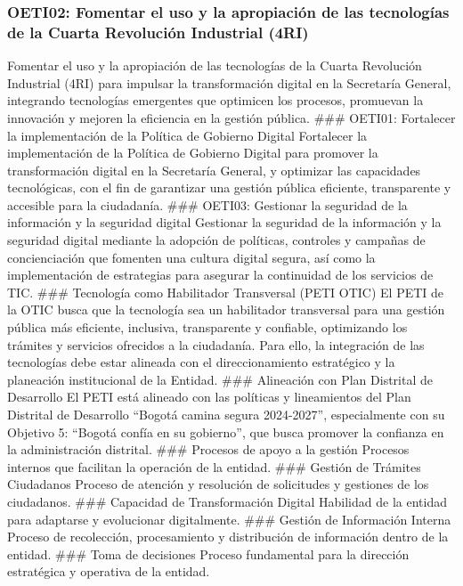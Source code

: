 \documentclass[
	a4paper, %
	12pt, %
]{include/CSSullivanBusinessReport}
\begin{document}
\subsubsection{OETI02: Fomentar el uso y la apropiación de las
tecnologías de la Cuarta Revolución Industrial
(4RI)}\label{sec:oeti02-fomentar-el-uso-y-la-apropiaciuxf3n-de-las-tecnologuxedas-de-la-cuarta-revoluciuxf3n-industrial-4ri}

Fomentar el uso y la apropiación de las tecnologías de la Cuarta
Revolución Industrial (4RI) para impulsar la transformación digital en
la Secretaría General, integrando tecnologías emergentes que optimicen
los procesos, promuevan la innovación y mejoren la eficiencia en la
gestión pública. \#\#\# OETI01: Fortalecer la implementación de la
Política de Gobierno Digital Fortalecer la implementación de la Política
de Gobierno Digital para promover la transformación digital en la
Secretaría General, y optimizar las capacidades tecnológicas, con el fin
de garantizar una gestión pública eficiente, transparente y accesible
para la ciudadanía. \#\#\# OETI03: Gestionar la seguridad de la
información y la seguridad digital Gestionar la seguridad de la
información y la seguridad digital mediante la adopción de políticas,
controles y campañas de concienciación que fomenten una cultura digital
segura, así como la implementación de estrategias para asegurar la
continuidad de los servicios de TIC. \#\#\# Tecnología como Habilitador
Transversal (PETI OTIC) El PETI de la OTIC busca que la tecnología sea
un habilitador transversal para una gestión pública más eficiente,
inclusiva, transparente y confiable, optimizando los trámites y
servicios ofrecidos a la ciudadanía. Para ello, la integración de las
tecnologías debe estar alineada con el direccionamiento estratégico y la
planeación institucional de la Entidad. \#\#\# Alineación con Plan
Distrital de Desarrollo El PETI está alineado con las políticas y
lineamientos del Plan Distrital de Desarrollo ``Bogotá camina segura
2024-2027'', especialmente con su Objetivo 5: ``Bogotá confía en su
gobierno'', que busca promover la confianza en la administración
distrital. \#\#\# Procesos de apoyo a la gestión Procesos internos que
facilitan la operación de la entidad. \#\#\# Gestión de Trámites
Ciudadanos Proceso de atención y resolución de solicitudes y gestiones
de los ciudadanos. \#\#\# Capacidad de Transformación Digital Habilidad
de la entidad para adaptarse y evolucionar digitalmente. \#\#\# Gestión
de Información Interna Proceso de recolección, procesamiento y
distribución de información dentro de la entidad. \#\#\# Toma de
decisiones Proceso fundamental para la dirección estratégica y operativa
de la entidad.
\end{document}
